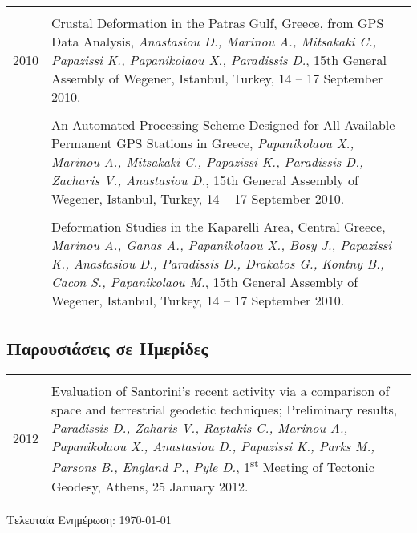\documentclass[a4paper,10pt]{article} %
\begin{document}
\begin{longtable}{r|p{14cm}}
\multicolumn{2}{c}{} \\
  \textsc{2010}
  & Crustal Deformation in the Patras Gulf, Greece, from GPS Data Analysis,
  \emph{Anastasiou D., Marinou A., Mitsakaki C., Papazissi K., Papanikolaou X., Paradissis D.},
  15th General Assembly of Wegener, Istanbul, Turkey, 14 – 17 September 2010.\\

  &\\

  & An Automated Processing Scheme Designed for All Available Permanent GPS Stations in Greece,
  \emph{Papanikolaou X., Marinou A., Mitsakaki C., Papazissi K., Paradissis D., Zacharis V., Anastasiou D.},
  15th General Assembly of Wegener, Istanbul, Turkey, 14 – 17 September 2010.\\

  &\\

  & Deformation Studies in the Kaparelli Area, Central Greece,
  \emph{Marinou A., Ganas A., Papanikolaou X., Bosy J., Papazissi K., Anastasiou D., Paradissis D., Drakatos G., Kontny B., Cacon S., Papanikolaou M.},
  15th General Assembly of Wegener, Istanbul, Turkey, 14 – 17 September 2010.\\
\end{longtable}

\subsection*{Παρουσιάσεις σε Ημερίδες}

\begin{longtable}{r|p{14cm}}
\multicolumn{2}{c}{} \\
  \textsc{2012}
  & Evaluation of Santorini's recent activity via a comparison of space and terrestrial geodetic techniques; Preliminary results,
  \emph{Paradissis D., Zaharis V., Raptakis C., Marinou A., Papanikolaou X., Anastasiou D., Papazissi K., Parks M., Parsons B., England P., Pyle D.},
  1\textsuperscript{st} Meeting of Tectonic Geodesy, Athens, 25 January 2012.\\
\end{longtable}
\medskip

\vfill
\begin{center}
  \begin{footnotesize}
    Τελευταία Ενημέρωση: \today
  \end{footnotesize}
\end{center}
\end{document}
